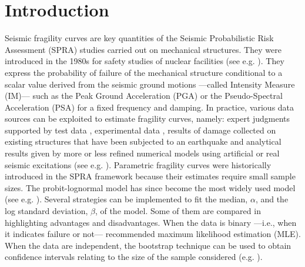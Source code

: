 \section{Introduction}


Seismic fragility curves are key quantities of the Seismic Probabilistic Risk Assessment (SPRA) studies carried out on mechanical structures. They were introduced in the 1980s for safety studies of nuclear facilities (see e.g.
\cite{kennedy_probabilistic_1980,kennedy_seismic_1984,park_survey_1998,kennedy_risk_1999,cornell_hazard_2004}).
They express the probability of failure of the mechanical structure conditional to a scalar value derived from the seismic ground motions ---called Intensity Measure (IM)--- such as the Peak Ground Acceleration (PGA) or the Pseudo-Spectral Acceleration (PSA) for a fixed frequency and damping. In practice, various data sources can be exploited to estimate fragility curves, namely: expert judgments supported by test data \citep{kennedy_probabilistic_1980,kennedy_seismic_1984,park_survey_1998,zentner_fragility_2017}, experimental data \citep{park_survey_1998,gardoni_probabilistic_2002,choe_closed-form_2007}, results of damage collected on existing structures that have been subjected to an earthquake \citep{shinozuka_statistical_2000,lallemant_statistical_2015,straub_improved_2008}  and analytical results given by more or less refined numerical models using artificial or real seismic excitations (see e.g. \cite{zentner_numerical_2010,wang_influence_2020,mandal_seismic_2016,wang_seismic_2018,wang_bayesian_2018,zhao_seismic_2020}). Parametric fragility curves were historically introduced in the SPRA framework because their estimates require small sample sizes. The probit-lognormal model has since become the most widely used model (see e.g. \cite{shinozuka_statistical_2000,lallemant_statistical_2015,straub_improved_2008,zentner_numerical_2010,wang_influence_2020,mandal_seismic_2016,wang_bayesian_2018,wang_seismic_2018,zhao_seismic_2020,ellingwood_earthquake_2001,kim_development_2004,mai_seismic_2017,trevlopoulos_parametric_2019,katayama_bayesian-estimation-based_2021}).
Several strategies can be implemented to fit the median, $\alpha$, and the log standard deviation, $\beta$, of the model. Some of them are compared in \cite{lallemant_statistical_2015} highlighting advantages and disadvantages.
When the data is binary ---i.e., when it indicates failure or not--- \citet{lallemant_statistical_2015} recommended maximum likelihood estimation (MLE). When the data are independent, the bootstrap technique can be used to obtain confidence intervals relating to the size of the sample considered (e.g. \cite{shinozuka_statistical_2000,zentner_numerical_2010,wang_influence_2020}). 

